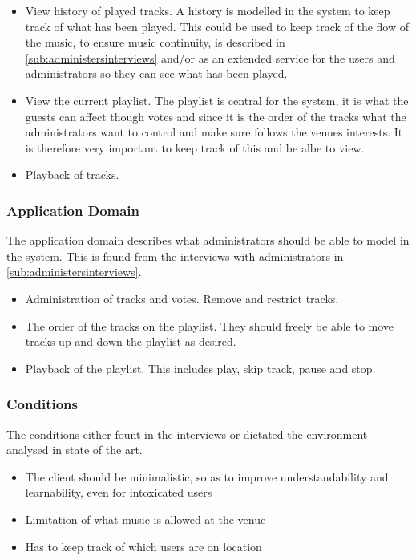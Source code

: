 \begin{itemize}
    \item View history of played tracks. A history is modelled in the system to keep track of what has been played. This could be used to keep track of the flow of the music, to ensure music continuity, is described in \cref{sub:administersinterviews} and/or as an extended service for the users and administrators so they can see what has been played.
		\item View the current playlist. The playlist is central for the system, it is what the guests can affect though votes and since it is the order of the tracks what the administrators want to control and make sure follows the venues interests. It is therefore very important to keep track of this and be albe to view.
    \item Playback of tracks.
\end{itemize}

\subsubsection{Application Domain}
The application domain describes what administrators should be able to model in the system. This is found from the interviews with administrators in \cref{sub:administersinterviews}.
\begin{itemize}
    \item Administration of tracks and votes. Remove and restrict tracks.
    \item The order of the tracks on the playlist. They should freely be able to move tracks up and down the playlist as desired.
    \item Playback of the playlist. This includes play, skip track, pause and stop.
\end{itemize}

\subsubsection{Conditions}
The conditions either fount in the interviews or dictated the environment analysed in state of the art.
\begin{itemize}
  \item The client should be minimalistic, so as to improve understandability and learnability, even for intoxicated users
  \item Limitation of what music is allowed at the venue
  \item Has to keep track of which users are on location
\end{itemize}

